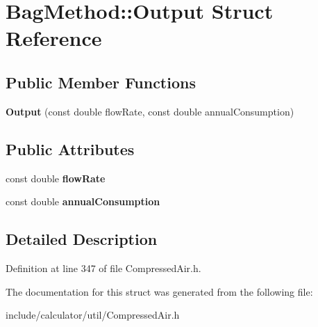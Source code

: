 \hypertarget{struct_bag_method_1_1_output}{}\section{Bag\+Method\+:\+:Output Struct Reference}
\label{struct_bag_method_1_1_output}
\subsection*{Public Member Functions}
\begin{DoxyCompactItemize}
\item 
\mbox{\label{struct_bag_method_1_1_output_a32476edc4a2b924580f0976732cb9aa0}} 
{\bfseries Output} (const double flow\+Rate, const double annual\+Consumption)
\end{DoxyCompactItemize}
\subsection*{Public Attributes}
\begin{DoxyCompactItemize}
\item 
\mbox{\label{struct_bag_method_1_1_output_a6625c932cfa3935a7198b8ed1747955f}} 
const double {\bfseries flow\+Rate}
\item 
\mbox{\label{struct_bag_method_1_1_output_ae287da01450815f1cc6d22b39944482a}} 
const double {\bfseries annual\+Consumption}
\end{DoxyCompactItemize}


\subsection{Detailed Description}


Definition at line 347 of file Compressed\+Air.\+h.



The documentation for this struct was generated from the following file\+:\begin{DoxyCompactItemize}
\item 
include/calculator/util/Compressed\+Air.\+h\end{DoxyCompactItemize}
